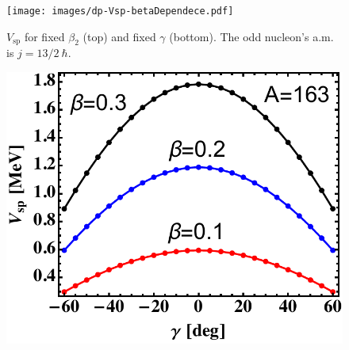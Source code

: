 \documentclass[final]{beamer}
\newlength{\colwidth}
\begin{document}
\begin{frame}[t]
\begin{columns}[t]
\begin{column}{\colwidth}
\begin{figure}
     \texttt{[image: images/dp-Vsp-betaDependece.pdf]}
     \caption{$V_\text{sp}$ for fixed $\beta_2$ (top) and fixed $\gamma$ (bottom). The odd nucleon's a.m. is $j=13/2\ \hbar$.}
     \label{gamma-beta-dev-v}
 \end{figure}
     \begin{figure}
     \centering
     \begin{minipage}{.5\textwidth}
  \centering
  \includegraphics[scale=1]{images/VSp_gammaBehavior.pdf}
\end{minipage}%
\begin{minipage}{.5\textwidth}
  \centering

\end{minipage}
\end{figure}
\end{column}
\end{columns}
\end{frame}
\end{document}
